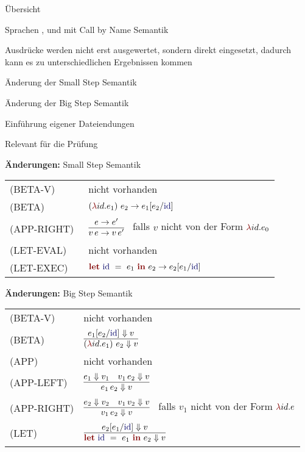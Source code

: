 {
  \begin{itemgroup}{Übersicht}
    \item Sprachen \LZEROCBN, \LONECBN und \LTWOCBN  mit Call by Name Semantik
    \item Ausdrücke werden nicht erst ausgewertet, sondern direkt eingesetzt,
          dadurch kann es zu unterschiedlichen Ergebnissen kommen
    \item Änderung der Small Step Semantik
    \item Änderung der Big Step Semantik
    \item Einführung eigener Dateiendungen
    \item Relevant für die Prüfung \glqq \TPONE \grqq
  \end{itemgroup}
}


{
  {\bf Änderungen:} Small Step Semantik\\[5mm]
  \begin{tabular}{ll}
     \mbox{(BETA-V)}      & nicht vorhanden \\[3mm]
     \mbox{(BETA)}        & $\ExprApplication{\Parenthesis{\ExprLambda{id}{}{e_1}}}{e_2} \to e_1[e_2/\id]$ \\[3mm]
     \mbox{(APP-RIGHT)\ } & $\regel{e \to e'}
                                   {v\,e \to v\,e'}$ \ 
                                   falls ${v}$ nicht von der Form $\ExprLambda{id}{}{e_0}$ \\[5mm]
     \mbox{(LET-EVAL)\  } & nicht vorhanden \\[3mm]
     \mbox{(LET-EXEC)}    & $\ExprLet{\id}{}{e_1}{e_2} \to e_2[e_1/\id]$ \\[3mm]
  \end{tabular}
}


{
  {\bf Änderungen:} Big Step Semantik\\[5mm]
  \begin{tabular}{ll}
     \mbox{(BETA-V)}      & nicht vorhanden \\[3mm]
     \mbox{(BETA)}        & $\regel{e_1[e_2/\id] \eval v}
                                   {\ExprApplication{\Parenthesis{\ExprLambda{id}{}{e_1}}}{e_2} \eval v}$ \\[5mm]
     \mbox{(APP)}         & nicht vorhanden \\[3mm]
     \mbox{(APP-LEFT)}    & $\regel{e_1 \eval v_1 \quad v_1\,e_2 \eval v}
                                   {e_1\,e_2 \eval v}$ \\[5mm]
     \mbox{(APP-RIGHT)}   & $\regel{e_2 \eval v_2 \quad v_1\,v_2 \eval v}
                                   {v_1\,e_2 \eval v}$ \ 
                                   falls ${v_1}$ nicht von der Form $\ExprLambda{id}{}{e}$ \\[5mm]
     \mbox{(LET)}         & $\regel{e_2[e_1/\id] \eval v}
                                   {\ExprLet{\id}{}{e_1}{e_2} \eval v}$ \\[5mm]
  \end{tabular}
}


